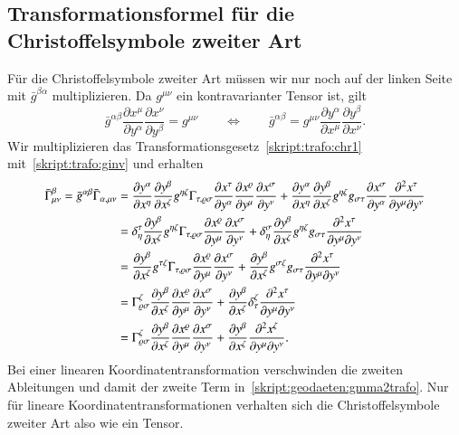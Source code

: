 \subsection{Transformationsformel für die Christoffelsymbole zweiter Art}
Für die Christoffelsymbole zweiter Art müssen wir nur noch auf der
linken Seite mit $\bar g^{\beta\alpha}$ multiplizieren.
Da $g^{\mu\nu}$ ein kontravarianter Tensor ist, gilt
\begin{equation}
\bar g^{\alpha\beta}
\frac{\partial x^\mu}{\partial y^\alpha}
\frac{\partial x^\nu}{\partial y^\beta}
=
g^{\mu\nu}
\qquad\Leftrightarrow\qquad
\bar g^{\alpha\beta}
=
g^{\mu\nu}
\frac{\partial y^\alpha}{\partial x^\mu}
\frac{\partial y^\beta}{\partial x^\nu}.
\label{skript:trafo:ginv}
\end{equation}
Wir multiplizieren das Transformationsgesetz~\eqref{skript:trafo:chr1}
mit~\eqref{skript:trafo:ginv} und erhalten
\begin{align}
\bar\Gamma^\beta_{\mu\nu}
=
\bar g^{\alpha\beta}
\bar\Gamma_{\alpha,\mu\nu}
&=
\frac{\partial y^\alpha}{\partial x^\eta}
\frac{\partial y^\beta}{\partial x^\zeta}
g^{\eta\zeta}
\Gamma_{\tau,\varrho\sigma}
\frac{\partial x^\tau}{\partial y^\alpha}
\frac{\partial x^\varrho}{\partial y^\mu}
\frac{\partial x^\sigma}{\partial y^\nu}
+
\frac{\partial y^\alpha}{\partial x^\eta}
\frac{\partial y^\beta}{\partial x^\zeta}
g^{\eta\zeta}
g_{\sigma\tau}
\frac{\partial x^\sigma}{\partial y^\alpha}
\frac{\partial^2 x^\tau}{\partial y^\mu\partial y^\nu}
\notag
\\
&=
\delta^\tau_\eta
\frac{\partial y^\beta}{\partial x^\zeta}
g^{\eta\zeta}
\Gamma_{\tau,\varrho\sigma}
\frac{\partial x^\varrho}{\partial y^\mu}
\frac{\partial x^\sigma}{\partial y^\nu}
+
\delta^\sigma_\eta
\frac{\partial y^\beta}{\partial x^\zeta}
g^{\eta\zeta}
g_{\sigma\tau}
\frac{\partial^2 x^\tau}{\partial y^\mu\partial y^\nu}
\notag
\\
&=
\frac{\partial y^\beta}{\partial x^\zeta}
g^{\tau\zeta}
\Gamma_{\tau,\varrho\sigma}
\frac{\partial x^\varrho}{\partial y^\mu}
\frac{\partial x^\sigma}{\partial y^\nu}
+
\frac{\partial y^\beta}{\partial x^\zeta}
g^{\sigma\zeta}
g_{\sigma\tau}
\frac{\partial^2 x^\tau}{\partial y^\mu\partial y^\nu}
\notag
\\
&=
\Gamma^\zeta_{\varrho\sigma}
\frac{\partial y^\beta}{\partial x^\zeta}
\frac{\partial x^\varrho}{\partial y^\mu}
\frac{\partial x^\sigma}{\partial y^\nu}
+
\frac{\partial y^\beta}{\partial x^\zeta}
\delta^\zeta_\tau
\frac{\partial^2 x^\tau}{\partial y^\mu\partial y^\nu}
\notag
\\
&=
\Gamma^\zeta_{\varrho\sigma}
\frac{\partial y^\beta}{\partial x^\zeta}
\frac{\partial x^\varrho}{\partial y^\mu}
\frac{\partial x^\sigma}{\partial y^\nu}
+
\frac{\partial y^\beta}{\partial x^\zeta}
\frac{\partial^2 x^\zeta}{\partial y^\mu\partial y^\nu}.
\label{skript:geodaeten:gmma2trafo}
\end{align}
Bei einer linearen Koordinatentransformation verschwinden die zweiten
Ableitungen und damit der zweite Term in~\eqref{skript:geodaeten:gmma2trafo}.
Nur für lineare Koordinatentransformationen verhalten sich die
Christoffelsymbole zweiter Art also wie ein Tensor.


